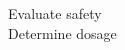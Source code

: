 \documentclass[preview]{standalone}
\begin{document}
Evaluate safety\\Determine dosage\\
\end{document}
